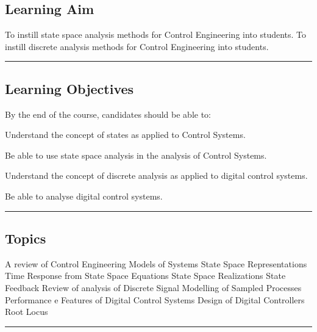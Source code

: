 \subsection*{Learning Aim}
To instill state space analysis methods for Control Engineering into students.
To instill discrete analysis methods for Control Engineering into students.
\vspace{2ex} \hrule\vspace{2ex}

\subsection*{Learning Objectives}
By the end of the course, candidates should be able to:
\begin{outline}
    \1      Understand the concept of states as applied to Control Systems.

    \1  	Be able to use state space analysis in the analysis of Control Systems.

    \1  	Understand the concept of discrete analysis as applied to digital control systems.

    \1  	Be able to analyse digital control systems.

\end{outline}
\vspace{2ex}\hrule\vspace{2ex}

\subsection*{Topics}
\begin{outline}
    \1 A review of Control Engineering
    \1 Models of Systems
    \1 State Space Representations
    \1 Time Response from State Space Equations
    \1 State Space Realizations
    \1 State Feedback
    \1 Review of analysis of Discrete Signal
    \1 Modelling of Sampled Processes
    \1 Performance e Features of Digital Control Systems
    \1 Design of Digital Controllers
    \1 Root Locus
\end{outline}
\vspace{2ex} \hrule\vspace{2ex}


